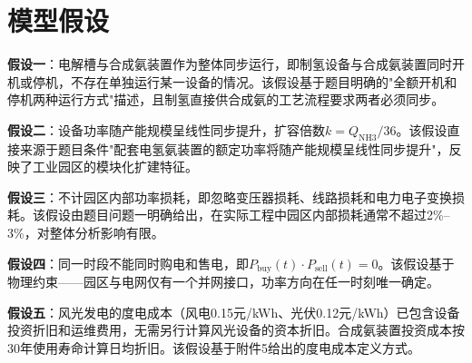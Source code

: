 \section{模型假设}

\textbf{假设一}：电解槽与合成氨装置作为整体同步运行，即制氢设备与合成氨装置同时开机或停机，不存在单独运行某一设备的情况。该假设基于题目明确的"全额开机和停机两种运行方式"描述，且制氢直接供合成氨的工艺流程要求两者必须同步。

\textbf{假设二}：设备功率随产能规模呈线性同步提升，扩容倍数$k = Q_{\text{NH3}} / 36$。该假设直接来源于题目条件"配套电氢氨装置的额定功率将随产能规模呈线性同步提升"，反映了工业园区的模块化扩建特征。

\textbf{假设三}：不计园区内部功率损耗，即忽略变压器损耗、线路损耗和电力电子变换损耗。该假设由题目问题一明确给出，在实际工程中园区内部损耗通常不超过2\%--3\%，对整体分析影响有限。

\textbf{假设四}：同一时段不能同时购电和售电，即$P_{\text{buy}}(t) \cdot P_{\text{sell}}(t) = 0$。该假设基于物理约束——园区与电网仅有一个并网接口，功率方向在任一时刻唯一确定。

\textbf{假设五}：风光发电的度电成本（风电0.15元/kWh、光伏0.12元/kWh）已包含设备投资折旧和运维费用，无需另行计算风光设备的资本折旧。合成氨装置投资成本按30年使用寿命计算日均折旧。该假设基于附件5给出的度电成本定义方式。
